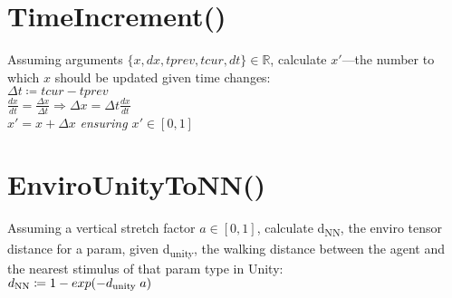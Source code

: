 \documentclass[12pt]{article}
\begin{document}

	\section*{TimeIncrement()}
	
	Assuming arguments $\{x, dx, tprev, tcur, dt\}\in\mathbb{R}$, calculate $x'$—the number to which $x$ should be updated given time changes:\\
	
	$\Delta t\coloneqq tcur - tprev$\\
	
	$\frac{dx}{dt} = \frac{\Delta x}{\Delta t}\Rightarrow\Delta x = \Delta t\frac{dx}{dt}$\\
	
	$x' = x + \Delta x$ \textit{ensuring $x'\in [0,1]$}\\

	\section*{EnviroUnityToNN()}
	
	Assuming a vertical stretch factor $a\in [0, 1]$, calculate d\textsubscript{NN}, the enviro tensor distance for a param, given d\textsubscript{unity}, the walking distance between the agent and the nearest stimulus of that param type in Unity:\\
	
	$d\textsubscript{NN}\coloneqq 1 - exp(-d\textsubscript{unity} \; a)$\\
	
\end{document}
